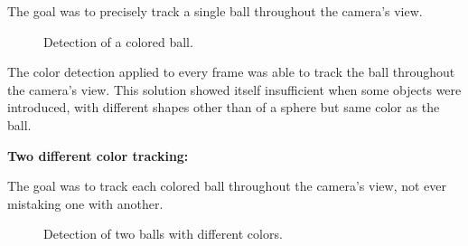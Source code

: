 \documentclass[10pt,twocolumn,letterpaper]{article}
\begin{document}
The goal was to precisely track a single ball throughout the camera's view.

\begin{figure}[!h]
\centering
\setlength{\fboxsep}{1pt}
\setlength{\fboxrule}{1pt}
\caption{Detection of a colored ball.}\label{fig:single_color}
\end{figure}

The color detection applied to every frame was able to track the ball
throughout the camera's view. This solution showed itself insufficient when
some objects were introduced, with different shapes other than of a sphere but
same color as the ball.

\bigbreak{}
\textbf{Two different color tracking:}
\bigbreak{}

The goal was to track each colored ball throughout the camera's view, not ever
mistaking one with another.

\begin{figure}[!h]
\centering
\setlength{\fboxsep}{1pt}
\setlength{\fboxrule}{1pt}
\caption{Detection of two balls with different colors.}\label{fig:diff_color}
\end{figure}
\end{document}
